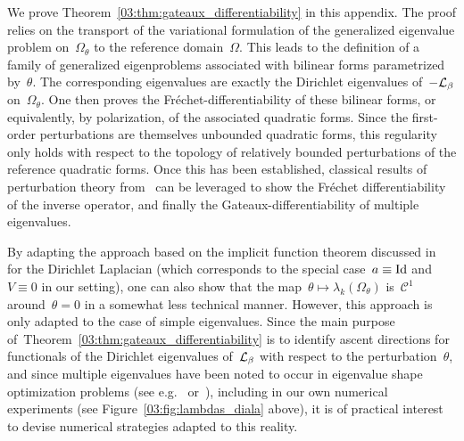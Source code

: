 \label{03:sec:proof}
We prove Theorem~\ref{03:thm:gateaux_differentiability} in this appendix. The proof relies on the transport of the variational formulation of the generalized eigenvalue problem on~$\Omega_\theta$ to the reference domain~$\Omega$.
This leads to the definition of a family of generalized eigenproblems associated with bilinear forms parametrized by~$\theta$. The corresponding eigenvalues are exactly the Dirichlet eigenvalues of~$-\mathcal{L}_\beta$ on~$\Omega_\theta$.
One then proves the Fréchet-differentiability of these bilinear forms, or equivalently, by polarization, of the associated quadratic forms. Since the first-order perturbations are themselves unbounded quadratic forms, this regularity only holds with respect to the topology of relatively bounded perturbations of the reference quadratic forms.
Once this has been established, classical results of perturbation theory from~\cite{K95} can be leveraged to show the Fréchet differentiability of the inverse operator, and finally the Gateaux-differentiability of multiple eigenvalues.
\begin{remark}
    By adapting the approach based on the implicit function theorem discussed in~\cite[Section 5.7]{HP05} for the Dirichlet Laplacian (which corresponds to the special case~$a\equiv\mathrm{Id}$ and~$V\equiv 0$ in our setting), one can also show that the map~$\theta\mapsto \lambda_k(\Omega_\theta)$ is~$\mathcal C^1$ around~$\theta=0$ in a somewhat less technical manner. 
    However, this approach is only adapted to the case of simple eigenvalues. Since the main purpose of~Theorem~\ref{03:thm:gateaux_differentiability} is to identify ascent directions for functionals of the Dirichlet eigenvalues of~$\mathcal{L}_\beta$ with respect to the perturbation~$\theta$,
    and since multiple eigenvalues have been noted to occur in eigenvalue shape optimization problems (see e.g.~\cite[Theorem 2.5.10]{H06} or~\cite[Section 4.5]{O04}), including in our own numerical experiments (see Figure~\ref{03:fig:lambdas_diala} above), it is of practical interest to devise numerical strategies adapted to this reality.
\end{remark}

